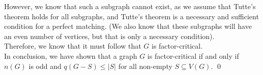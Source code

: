 \linebreak
However, we know that such a subgraph cannot exist, as we assume that Tutte's theorem holds for all subgraphs, and Tutte's theorem is a necessary and sufficient condition for a perfect matching. (We also know that these subgraphs will have an even number of vertices, but that is only a necessary condition). \\
\linebreak 
Therefore, we know that it must follow that $G$ is factor-critical. \\
\linebreak 
In conclusion, we have shown that a graph $G$ is factor-critical if and only if $n(G)$ is odd and $q(G-S) \leq |S|$ for all non-empty $S \subseteq V (G)$. \qed